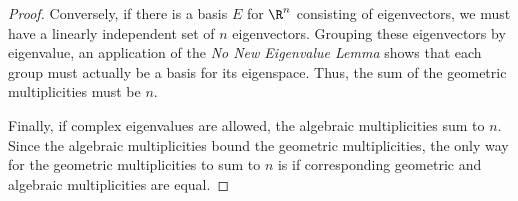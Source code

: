 \begin{proof}
	Conversely, if there is
	a basis $E$ for $\R^n$ consisting of eigenvectors, we must have a linearly independent set of $n$ eigenvectors. Grouping
	these eigenvectors by eigenvalue, an application of the \emph{No New Eigenvalue Lemma} shows that each group
	must actually be a basis for its eigenspace. Thus, the sum of the geometric
	multiplicities must be $n$.

	Finally, if complex eigenvalues are allowed, the algebraic multiplicities sum to $n$. Since the algebraic multiplicities
	bound the geometric multiplicities, the only way for the geometric multiplicities to sum to $n$ is if
	corresponding geometric and algebraic multiplicities are equal.


\end{proof}
